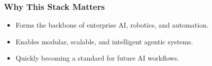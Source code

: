 \begin{frame}[fragile]\frametitle{Why This Stack Matters}
    \begin{itemize}
        \item Forms the backbone of enterprise AI, robotics, and automation.
        \item Enables modular, scalable, and intelligent agentic systems.
        \item Quickly becoming a standard for future AI workflows.
    \end{itemize}
\end{frame}
